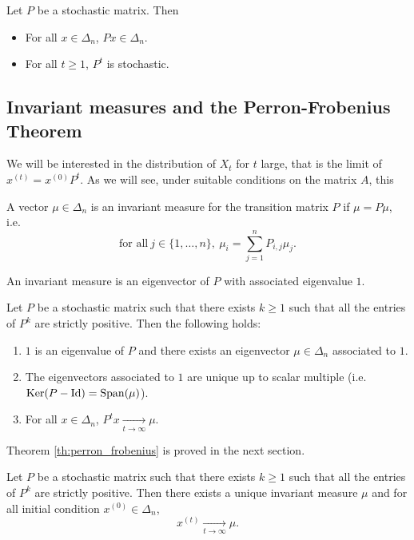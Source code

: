 \documentclass[11pt,nocut]{article}
\begin{document}
\begin{corollary}\label{cor:stab}
	Let $P$ be a stochastic matrix. Then
	\begin{itemize}
		\item For all $x \in \Delta_n$, $Px \in \Delta_n$.
		\item For all $t \geq 1$, $P^t$ is stochastic.
	\end{itemize}
\end{corollary}


\subsection{Invariant measures and the Perron-Frobenius Theorem}
We will be interested in the distribution of $X_t$ for $t$ large, that is the limit of $x^{(t)} = x^{(0)} P^t$. As we will see, under suitable conditions on the matrix $A$, this

\begin{definition}
	A vector $\mu \in \Delta_n$ is an invariant measure for the transition matrix $P$ if $\mu = P \mu$, i.e.\
	$$
	\text{for all} \ j \in \{1, \dots, n\}, \ \mu_i = \sum_{j=1}^n P_{i,j} \mu_j.
	$$
\end{definition}

\begin{remark}
	An invariant measure is an eigenvector of $P$ with associated eigenvalue $1$.
\end{remark}


\begin{theorem}\label{th:perron_frobenius}
	Let $P$ be a stochastic matrix such that there exists $k \geq 1$ such that all the entries of $P^k$ are strictly positive. Then the following holds:
	\begin{enumerate}[label=(\roman*),noitemsep]
		\item\label{item:i} $1$ is an eigenvalue of $P$ and there exists an eigenvector $\mu \in \Delta_n$ associated to $1$.
		\item\label{item:ii} The eigenvectors associated to $1$ are unique up to scalar multiple (i.e.\ ${{\rm Ker}}(P-{{\rm Id}}) = {{\rm Span}}(\mu)$).
		\item\label{item:iii} For all $x \in \Delta_n$, $P^t x \xrightarrow[t \to \infty]{} \mu$.
	\end{enumerate}
\end{theorem}

Theorem \ref{th:perron_frobenius} is proved in the next section.

\begin{corollary}\label{cor:perron}
	Let $P$ be a stochastic matrix such that there exists $k \geq 1$ such that all the entries of $P^k$ are strictly positive. Then there exists a unique invariant measure $\mu$ and for all initial condition $x^{(0)} \in \Delta_n$,
	$$
	x^{(t)} \xrightarrow[t \to \infty]{} \mu.
	$$
\end{corollary}
\end{document}
